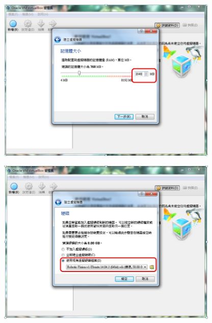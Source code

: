 \documentclass{article}
\begin{document}
\begin{figure}[htp]
    \begin{center}
        \includegraphics[width=300pt]{pic/圖片4.jpg}
    \end{center}
\end{figure}

\begin{figure}[htp]
    \begin{center}
        \includegraphics[width=300pt]{pic/圖片5.jpg}
    \end{center}
\end{figure}
\end{document}
